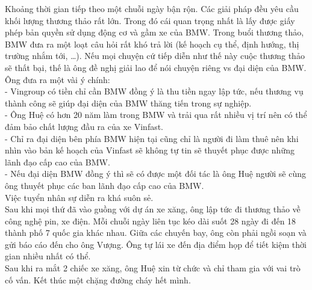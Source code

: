 \documentclass{article}
\newcommand\tab[1][1cm]{\hspace*{#1}}
\begin{document}
\tab Khoảng thời gian tiếp theo một chuỗi ngày bận rộn. Các giải pháp đều yêu cầu khối lượng thương thảo rất lớn.
Trong đó cái quan trọng nhất là lấy được giấy phép bản quyền sử dụng động cơ và gầm xe của BMW. Trong buổi thương 
thảo, BMW đưa ra một loạt câu hỏi rất khó trả lời (kế hoạch cụ thể, định hướng, thị trường nhắm tới, \dots). Nếu mọi 
chuyện cứ tiếp diễn như thế này cuộc thương thảo sẽ thất bại, thế là ông đề nghị giải lao để nói chuyện riêng vs đại 
diện của BMW. Ông đưa ra một vài ý chính: \\
\tab - Vingroup có tiền chỉ cần BMW đồng ý là thu tiền ngay lập tức, nếu thương vụ thành công sẽ giúp đại diện của BMW 
thăng tiến trong sự nghiệp.\\
\tab - Ông Huệ có hơn 20 năm làm trong BMW và trải qua rất nhiều vị trí nên có thể đảm bảo chất lượng đầu ra của xe Vinfast.\\
\tab - Chỉ ra đại diện bên phía BMW hiện tại cũng chỉ là người đi làm thuê nên khi nhìn vào bản kế hoạch của Vinfast sẽ 
không tự tin sẽ thuyết phục được những lãnh đạo cấp cao của BMW.\\
\tab - Nếu đại diện BMW đồng ý thì sẽ có được một đối tác là ông Huệ người sẽ cùng ông thuyết phục các ban lãnh đạo cấp 
cao của BMW.\\
\tab Việc tuyển nhân sự diễn ra khá suôn sẻ.\\
\tab Sau khi mọi thứ đã vào guồng với dự án xe xăng, ông lập tức đi thương thảo về công nghệ pin, xe điện. Mỗi chuỗi ngày liên
tục kéo dài suốt 28 ngày đi đến 18 thành phố 7 quốc gia khác nhau. Giữa các chuyến bay, ông còn phải ngồi soạn và gửi báo cáo 
đến cho ông Vượng. Ông tự lái xe đến địa điểm họp để tiết kiệm thời gian nhiều nhất có thể.\\
\tab Sau khi ra mắt 2 chiếc xe xăng, ông Huệ xin từ chức và chỉ tham gia với vai trò cố vấn. Kết thúc một chặng đường cháy hết 
mình.\\
\end{document}
